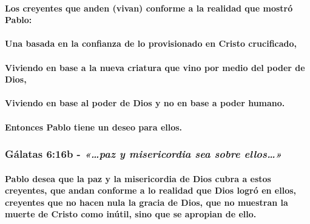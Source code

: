 \documentclass[11a pt,twoside]{article}
\newcommand{\scripture}[1]{%
  {\fontsize{12pt}{16pt}\selectfont\ScriptureFont\itshape #1}%
}
\let\oldsubsubsection\subsubsection
\renewcommand{\subsubsection}{\needspace{4\baselineskip}\oldsubsubsection}
\let\oldparagraph\paragraph
\renewcommand{\paragraph}{\needspace{3\baselineskip}\oldparagraph}
\begin{document}
\paragraph{Los creyentes que anden (vivan) conforme a la realidad que
mostró
Pablo:}\label{los-creyentes-que-anden-vivan-conforme-a-la-realidad-que-mostruxf3-pablo}

\paragraph{Una basada en la confianza de lo provisionado en Cristo
crucificado,}\label{una-basada-en-la-confianza-de-lo-provisionado-en-cristo-crucificado}

\paragraph{Viviendo en base a la nueva criatura que vino por medio del
poder de
Dios,}\label{viviendo-en-base-a-la-nueva-criatura-que-vino-por-medio-del-poder-de-dios}

\paragraph{Viviendo en base al poder de Dios y no en base a poder
humano.}\label{viviendo-en-base-al-poder-de-dios-y-no-en-base-a-poder-humano.}

\paragraph{Entonces Pablo tiene un deseo para
ellos.}\label{entonces-pablo-tiene-un-deseo-para-ellos.}

\subsubsection{\texorpdfstring{Gálatas 6:16b -
\scripture{«…paz y misericordia sea sobre ellos…»}}{Gálatas 6:16b - }}\label{guxe1latas-616b---paz-y-misericordia-sea-sobre-ellos}

\paragraph{Pablo desea que la paz y la misericordia de Dios cubra a
estos creyentes, que andan conforme a lo realidad que Dios logró en
ellos, creyentes que no hacen nula la gracia de Dios, que no muestran la
muerte de Cristo como inútil, sino que se apropian de
ello.}\label{pablo-desea-que-la-paz-y-la-misericordia-de-dios-cubra-a-estos-creyentes-que-andan-conforme-a-lo-realidad-que-dios-logruxf3-en-ellos-creyentes-que-no-hacen-nula-la-gracia-de-dios-que-no-muestran-la-muerte-de-cristo-como-inuxfatil-sino-que-se-apropian-de-ello.}
\end{document}
